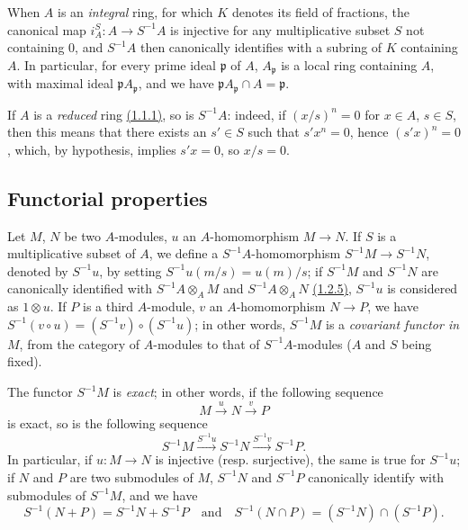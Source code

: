 \begin{env}[1.2.7]
\label{0.1.2.7}
When $A$ is an {\em integral} ring, for which $K$ denotes its field of
fractions, the canonical map $i_A^S:A\to S^{-1}A$ is injective for any
multiplicative subset $S$ not containing $0$, and $S^{-1}A$ then canonically
identifies with a subring of $K$ containing $A$. In particular, for every prime
ideal $\mathfrak{p}$ of $A$, $A_\mathfrak{p}$ is a local ring containing $A$,
with maximal ideal $\mathfrak{p}A_\mathfrak{p}$, and we have
$\mathfrak{p}A_\mathfrak{p}\cap A=\mathfrak{p}$.
\end{env}

\begin{env}[1.2.8]
\label{0.1.2.8}
If $A$ is a {\em reduced} ring \hyperref[0.1.1.1]{(1.1.1)}, so is $S^{-1}A$: indeed, if
$(x/s)^n=0$ for $x\in A$, $s\in S$, then this means that there exists an
$s'\in S$ such that $s' x^n=0$, hence $(s' x)^n=0$, which, by hypothesis, implies
$s' x=0$, so $x/s=0$.
\end{env}

\subsection{Functorial properties}
\label{subsection-func-ring-of-fractions}

\begin{env}[1.3.1]
\label{0.1.3.1}
Let $M$, $N$ be two $A$-modules, $u$ an $A$-homomorphism $M\to N$. If $S$ is a
multiplicative subset of $A$, we define a $S^{-1}A$-homomorphism
$S^{-1}M\to S^{-1}N$, denoted by $S^{-1}u$, by setting $S^{-1}u(m/s)=u(m)/s$; if
$S^{-1}M$ and $S^{-1}N$ are canonically identified with $S^{-1}A\otimes_A M$ and
$S^{-1}A\otimes_A N$ \hyperref[0.1.2.5]{(1.2.5)}, $S^{-1}u$ is considered as $1\otimes u$.
If $P$ is a third $A$-module, $v$ an $A$-homomorphism $N\to P$, we have
$S^{-1}(v\circ u)=(S^{-1}v)\circ(S^{-1}u)$; in other words, $S^{-1}M$ is a
{\em covariant functor in $M$}, from the category of $A$-modules to that of
$S^{-1}A$-modules ($A$ and $S$ being fixed).
\end{env}

\begin{env}[1.3.2]
\label{0.1.3.2}
The functor $S^{-1}M$ is {\em exact}; in other words, if the following sequence
\[
  M\xrightarrow{u}N\xrightarrow{v}P
\]
is exact, so is the following sequence
\[
  S^{-1}M\xrightarrow{S^{-1}u}S^{-1}N\xrightarrow{S^{-1}v}S^{-1}P.
\]
In particular, if $u:M\to N$ is injective (resp. surjective), the same is true
for $S^{-1}u$;
if $N$ and $P$ are two submodules of $M$, $S^{-1}N$ and $S^{-1}P$ canonically
identify with submodules of $S^{-1}M$, and we have
\[
  S^{-1}(N+P)=S^{-1}N+S^{-1}P
  \quad\text{and}\quad
  S^{-1}(N\cap P)=(S^{-1}N)\cap(S^{-1}P).
\]
\end{env}

